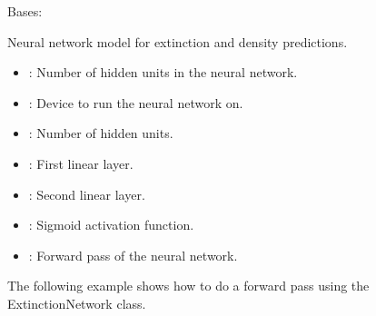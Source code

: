 \documentclass[letterpaper,10pt,english]{sphinxmanual}
\begin{document}
\begin{fulllineitems}
\label{\detokenize{ExtinctionNetwork:ExtinctionNetwork.ExtinctionNetwork}}
\pysigstartsignatures
{}
\pysigstopsignatures
\sphinxAtStartPar
Bases: 

\sphinxAtStartPar
Neural network model for extinction and density predictions.
\begin{description}
\begin{itemize}
\item {} 
\sphinxAtStartPar
{}: Number of hidden units in the neural network.

\item {} 
\sphinxAtStartPar
{}: Device to run the neural network on.

\end{itemize}

\begin{itemize}
\item {} 
\sphinxAtStartPar
{}: Number of hidden units.

\item {} 
\sphinxAtStartPar
{}: First linear layer.

\item {} 
\sphinxAtStartPar
{}: Second linear layer.

\item {} 
\sphinxAtStartPar
{}: Sigmoid activation function.

\end{itemize}

\begin{itemize}
\item {} 
\sphinxAtStartPar
{}: Forward pass of the neural network.

\end{itemize}

\sphinxAtStartPar
The following example shows how to do a forward pass using the ExtinctionNetwork class.


\end{description}
\end{fulllineitems}
\end{document}
